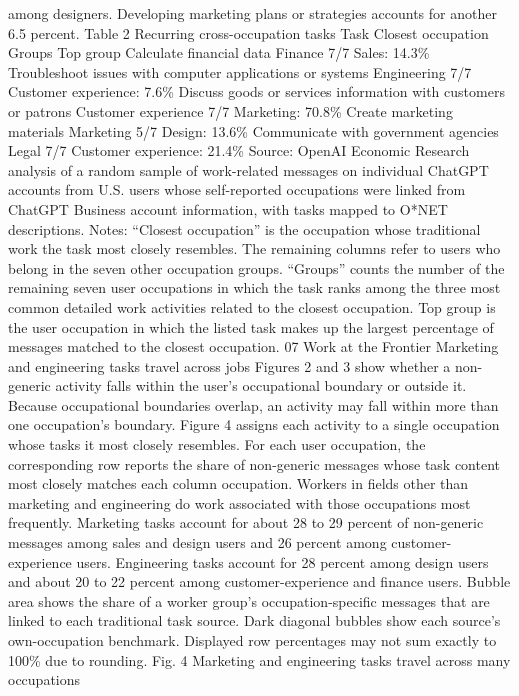 among designers. Developing marketing plans or strategies accounts for another 6.5 percent.
Table 2
Recurring cross-occupation tasks
Task
Closest
occupation
Groups
Top group
Calculate financial data
Finance
7/7
Sales: 14.3\%
Troubleshoot issues with
computer applications or
systems
Engineering
7/7
Customer experience: 7.6\%
Discuss goods or services
information with customers
or patrons
Customer
experience
7/7
Marketing: 70.8\%
Create marketing materials
Marketing
5/7
Design: 13.6\%
Communicate with
government agencies
Legal
7/7
Customer experience: 21.4\%
Source: OpenAI Economic Research analysis of a random sample of work-related messages on individual ChatGPT accounts
from U.S. users whose self-reported occupations were linked from ChatGPT Business account information, with tasks mapped
to O*NET descriptions. Notes: “Closest occupation” is the occupation whose traditional work the task most closely resembles.
The remaining columns refer to users who belong in the seven other occupation groups. “Groups” counts the number of the
remaining seven user occupations in which the task ranks among the three most common detailed work activities related
to the closest occupation. Top group is the user occupation in which the listed task makes up the largest percentage of
messages matched to the closest occupation.
07
Work at the Frontier
Marketing and engineering tasks travel
across jobs
Figures 2 and 3 show whether a non-generic activity falls within the user’s occupational boundary
or outside it. Because occupational boundaries overlap, an activity may fall within more than one
occupation’s boundary. Figure 4 assigns each activity to a single occupation whose tasks it most
closely resembles. For each user occupation, the corresponding row reports the share of non-generic
messages whose task content most closely matches each column occupation. Workers in fields other
than marketing and engineering do work associated with those occupations most frequently. Marketing
tasks account for about 28 to 29 percent of non-generic messages among sales and design users and
26 percent among customer-experience users. Engineering tasks account for 28 percent among design
users and about 20 to 22 percent among customer-experience and finance users.
Bubble area shows the share of a worker group’s occupation-specific messages that are linked to each
traditional task source. Dark diagonal bubbles show each source’s own-occupation benchmark. Displayed
row percentages may not sum exactly to 100\% due to rounding.
Fig. 4
Marketing and engineering tasks travel across many occupations
